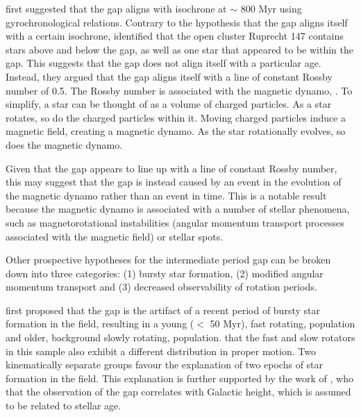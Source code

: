 \citet{reinhold_transition_2019} first suggested that the gap aligns with isochrone at $\sim$ 800 Myr using \citet{barnes_simple_2010} gyrochronological relations.
Contrary to the hypothesis that the gap aligns itself with a certain isochrone, \citet{curtis_when_2020} identified that the open cluster Ruprecht 147 contains stars above and below the gap, as well as one star that appeared to be within the gap.
This suggests that the gap does not align itself with a particular age.
Instead, they argued that the gap aligns itself with a line of constant Rossby number of 0.5.
The Rossby number is associated with the magnetic dynamo, \citep[see, e.g.,][]{noyes_rotation_1984, montesinos_new_2001, augustson_rossby_2019}.
To simplify, a star can be thought of as a volume of charged particles.
As a star rotates, so do the charged particles within it.
Moving charged particles induce a magnetic field, creating a magnetic dynamo.
As the star rotationally evolves, so does the magnetic dynamo.

Given that the gap appears to line up with a line of constant Rossby number, this may suggest that the gap is instead caused by an event in the evolution of the magnetic dynamo rather than an event in time.
This is a notable result because the magnetic dynamo is associated with a number of stellar phenomena, such as magnetorotational instabilities (angular momentum transport processes associated with the magnetic field) or stellar spots.

Other prospective hypotheses for the intermediate period gap can be broken down into three categories: (1) bursty star formation, (2) modified angular momentum transport and (3) decreased observability of rotation periods.

\citet{mcquillan_rotation_2014, davenport_rotating_2017} first proposed that the gap is the artifact of a recent period of bursty star formation in the \kepler{} field, resulting in a young ($<$ 50 Myr), fast rotating, population and older, background slowly rotating, population.
\citet{davenport_rotating_2017}  that the fast and slow rotators in this sample also exhibit a different distribution in proper motion. 
Two kinematically separate groups  favour the explanation of two epochs of star formation in the \kepler{} field. 
This explanation is further supported by the work of \citet{davenport_rotating_2018}, who  that the observation of the gap correlates with Galactic height, which is assumed to be related to stellar age.

